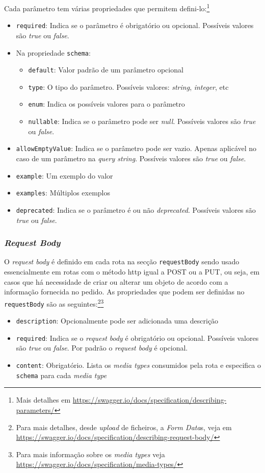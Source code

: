 Cada parâmetro tem várias propriedades que permitem defini-lo:\footnote{Mais detalhes em \url{https://swagger.io/docs/specification/describing-parameters/}}
\begin{itemize}
    \item \texttt{required}: Indica se o parâmetro é obrigatório ou opcional. Possíveis valores são \textit{true} ou \textit{false}.
    \item Na propriedade \texttt{schema}:
    \begin{itemize}
        \item \texttt{default}: Valor padrão de um parâmetro opcional
        \item \texttt{type}: O tipo do parâmetro. Possíveis valores: \textit{string}, \textit{integer}, etc
        \item \texttt{enum}: Indica os possíveis valores para o parâmetro
        \item \texttt{nullable}: Indica se o parâmetro pode ser \textit{null}. Possíveis valores são \textit{true} ou \textit{false}.
    \end{itemize}
    \item \texttt{allowEmptyValue}: Indica se o parâmetro pode ser vazio. Apenas aplicável no caso de um parâmetro na \textit{query string}. Possíveis valores são \textit{true} ou \textit{false}.
    \item \texttt{example}: Um exemplo do valor
    \item \texttt{examples}: Múltiplos exemplos
    \item \texttt{deprecated}: Indica se o parâmetro é ou não \textit{deprecated}. Possíveis valores são \textit{true} ou \textit{false}.
\end{itemize}

\subsubsection{\textit{Request Body}}
O \textit{request body} é definido em cada rota na secção \texttt{requestBody} sendo usado essencialmente em rotas com o método \acrshort{http} igual a POST ou a PUT, ou seja, em casos que há necessidade de criar ou alterar um objeto de acordo com a informação fornecida no pedido. As propriedades que podem ser definidas no \texttt{requestBody} são as seguintes:\footnote{Para mais detalhes, desde \textit{upload} de ficheiros, a \textit{Form Data}s, veja em \url{https://swagger.io/docs/specification/describing-request-body/}}\footnote{Para mais informação sobre os \textit{media types} veja \url{https://swagger.io/docs/specification/media-types/}}
\begin{itemize}
    \item \texttt{description}: Opcionalmente pode ser adicionada uma descrição
    \item \texttt{required}: Indica se o \textit{request body} é obrigatório ou opcional. Possíveis valores são \textit{true} ou \textit{false}. Por padrão o \textit{request body} é opcional.
    \item \texttt{content}: Obrigatório. Lista os \textit{media types} consumidos pela rota e especifica o \texttt{schema} para cada \textit{media type}
\end{itemize}

